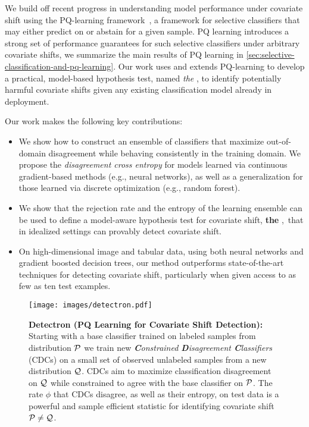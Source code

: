We build off recent progress in understanding model performance under covariate shift using the PQ-learning framework~\citep{pqlearn}, a framework for selective classifiers that may either predict on or abstain for a given sample.
PQ learning introduces a strong set of performance guarantees for such selective classifiers under arbitrary covariate shifts, we summarize the main results of PQ learning in \autoref{sec:selective-classification-and-pq-learning}.
Our work uses and extends PQ-learning to develop a practical, model-based hypothesis test, named \textit{the \method}, to identify potentially harmful covariate shifts given any existing classification model already in deployment.

\smallbreak\noindent
Our work makes the following key contributions:

\begin{itemize}
    \item We show how to construct an ensemble of classifiers that maximize out-of-domain disagreement while behaving consistently in the training domain.
    We propose the \emph{disagreement cross entropy} for models learned via continuous gradient-based methods (e.g., neural networks), as well as a generalization for those learned via discrete optimization (e.g., random forest).
    \item We show that the rejection rate and the entropy of the learning ensemble can be used to define a model-aware hypothesis test for covariate shift, \textbf{the \method},\ that in idealized settings can provably detect covariate shift.
    \item On high-dimensional image and tabular data, using both neural networks and gradient boosted decision trees, our method outperforms state-of-the-art techniques for detecting covariate shift, particularly when given access to as few as ten test examples.
\end{itemize}

\begin{figure}[!htb]
    \centering
    \texttt{[image: images/detectron.pdf]}
    \caption{\small \textbf{Detectron (PQ Learning for Covariate Shift Detection):} Starting with a base classifier trained on labeled samples from distribution $\mathcal{P}$ we
    train new \textit{\textbf{C}onstrained \textbf{D}isagreement \textbf{C}lassifiers} (CDCs) on a small set of observed unlabeled samples from a new distribution $\mathcal{Q}$.
    CDCs aim to maximize classification disagreement on $\mathcal{Q}$ while constrained to agree with the base classifier on $\mathcal{P}$. The rate $\phi$ that CDCs disagree,
        as well as their entropy, on test data is a powerful and sample efficient statistic for identifying covariate shift $\mathcal{P}\neq \mathcal{Q}$.}
    \label{fig:detectron}
\end{figure}